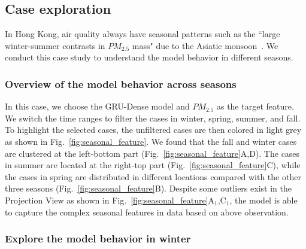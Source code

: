 \subsection{Case exploration}

In Hong Kong, air quality always have seasonal patterns such as the ``large winter-summer contrasts in $PM_{2.5}$ mass" due to the Asiatic monsoon~\cite{louie2005seasonal}. 
We conduct this case study to understand the model behavior in different seasons.  

\subsubsection{Overview of the model behavior across seasons}

In this case, we choose the GRU-Dense model and $PM_{2.5}$ as the target feature.
We switch the time ranges to filter the cases in winter, spring, summer, and fall. 
To highlight the selected cases, the unfiltered cases are then colored in light grey as shown in Fig.~\ref{fig:seasonal_feature}. 
We found that the fall and winter cases are clustered at the left-bottom part (Fig.~\ref{fig:seasonal_feature}A,D). 
The cases in summer are located at the right-top part (Fig.~\ref{fig:seasonal_feature}C), while the cases in spring are distributed in different locations compared with the other three seasons (Fig.~\ref{fig:seasonal_feature}B).
Despite some outliers exist in the Projection View as shown in Fig.~\ref{fig:seasonal_feature}A$_1$,C$_1$, the model is able to capture the complex seasonal features in data based on above observation. 

\subsubsection{Explore the model behavior in winter}


